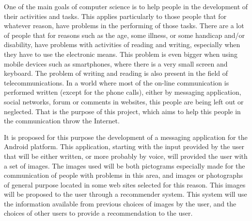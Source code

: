 One of the main goals of computer science is to help people in the development of their activities and tasks. This applies particularly to those people that for whatever reason, have problems in the performing of those tasks. There are a lot of people that for reasons such as the age, some illness, or some handicap and/or disability, have problems with activities of reading and writing, especially when they have to use the electronic means. This problem is even bigger when using mobile devices such as smartphones, where there is a very small screen and keyboard. The problem of writing and reading is also present in the field of telecommunications. In a world where most of the on-line communication is performed written (except for the phone calls),  either by messaging application, social networks, forum or comments in websites, this people are being left out or neglected. That is the purpose of this project,  which aims to help this people in the communication throw the Internet.

It is proposed for this purpose the development of a messaging application for the Android platform. This application, starting with the input provided by the user that will be either written, or more probably by voice, will provided the user with a set of images. The images used will be both pictograms especially made for the communication of people with problems in this area, and images or photographs of general purpose located in some web sites selected for this reason. This images will be proposed  to the user through a recommender system. This system will use the information available from previous choices of images by the user, and the choices of other users to provide a recommendation to the user.